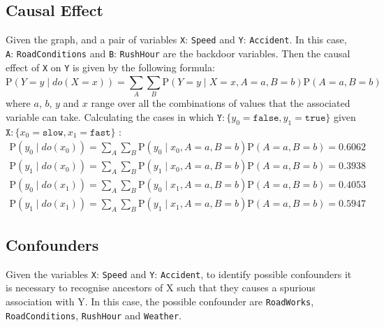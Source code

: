 \documentclass[a4paper,12pt]{article} %
\begin{document}
\subsection*{Causal Effect}
Given the graph, and a pair of variables \texttt{X}: \texttt{Speed} and \texttt{Y}: \texttt{Accident}. In this case, \texttt{A}: \texttt{RoadConditions} and \texttt{B}: \texttt{RushHour} are the backdoor variables. Then the causal effect of \texttt{X} on \texttt{Y} is given by the following formula:
\begin{equation}
	\text{P}(Y = y \mid {do}(X = x)) = \sum_{A}^{}\sum_{B}^{}	\text{P}(Y = y \mid X = x, A = a, B = b)\text{P}(A = a, B = b)
\end{equation}
where $a$, $b$, $y$ and $x$ range over all the combinations of values that the associated variable can take.
Calculating the cases in which $\mathtt{Y}: \{ y_0=\mathtt{false}, y_1=\mathtt{true}\}$ given $\mathtt{X}: \{ x_0=\mathtt{slow}, x_1=\mathtt{fast}\}$ :
\begin{equation*}
\begin{aligned}
\text{P}(y_0 \mid {do}(x_0)) = \sum_{A}^{}\sum_{B}^{}	\text{P}(y_0 \mid x_0, A = a, B = b)\text{P}(A = a, B = b)  = 0.6062	
\\
\text{P}(y_1 \mid {do}(x_0)) = \sum_{A}^{}\sum_{B}^{}	\text{P}(y_1 \mid x_0, A = a, B = b)\text{P}(A = a, B = b) = 0.3938
\end{aligned}
\end{equation*}
\begin{equation*}
\begin{aligned}
\text{P}(y_0 \mid {do}(x_1)) = \sum_{A}^{}\sum_{B}^{}	\text{P}(y_0 \mid x_1, A = a, B = b)\text{P}(A = a, B = b) =  0.4053	
\\
\text{P}(y_1 \mid {do}(x_1)) = \sum_{A}^{}\sum_{B}^{}	\text{P}(y_1 \mid x_1, A = a, B = b)\text{P}(A = a, B = b) =  0.5947
\end{aligned}
\end{equation*}

\subsection*{Confounders}
Given the variables \texttt{X}: \texttt{Speed} and \texttt{Y}: \texttt{Accident}, to identify possible confounders it is necessary to recognise ancestors of X such that they causes a spurious association with Y. In this case, the possible confounder are \texttt{RoadWorks}, \texttt{RoadConditions}, \texttt{RushHour} and \texttt{Weather}.
\end{document}
